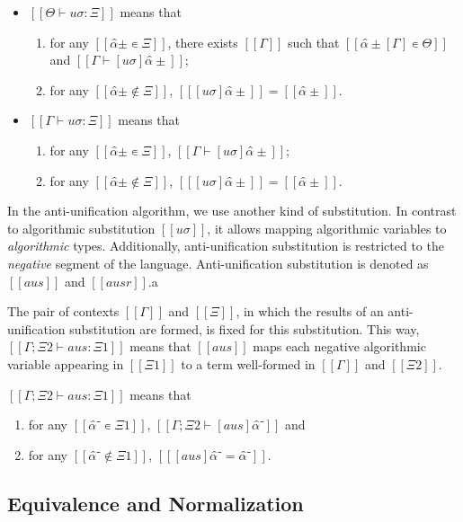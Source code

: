 \documentclass[acmsmall,natbib=false,review,anonymous]{acmart}
\begin{document}
\begin{definition}
  \label{def:algo-subst-sig}
  \hfill
  \begin{itemize}
    \item $[[Θ ⊢ uσ : Ξ]]$ means that
      \begin{enumerate}
        \item for any $[[α̂± ∊ Ξ]]$,
          there exists $[[Γ]]$ such that $[[ α̂±[Γ] ∊ Θ ]]$
          and $[[ Γ ⊢ [uσ]α̂± ]]$; 
        \item for any $[[ α̂± ∉ Ξ]]$, $[[ [uσ]α̂± ]] =  [[ α̂± ]]$.
      \end{enumerate}
    \item $[[Γ ⊢ uσ : Ξ]]$ means that
      \begin{enumerate}
        \item for any $[[α̂± ∊ Ξ]]$, $[[ Γ ⊢ [uσ]α̂± ]]$; 
        \item for any $[[ α̂± ∉ Ξ]]$, $[[ [uσ]α̂± ]] =  [[ α̂± ]]$.
      \end{enumerate}
  \end{itemize}
\end{definition}

In the anti-unification algorithm, we use another kind of substitution.
In contrast to algorithmic substitution $[[uσ]]$,
it allows mapping algorithmic variables to
\emph{algorithmic} types.
Additionally, anti-unification substitution is restricted to the
\emph{negative} segment of the language.
Anti-unification substitution is denoted as $[[aus]]$ and $[[ausr]]$.a

The pair of contexts $[[Γ]]$ and $[[Ξ]]$,
in which the results of an anti-unification substitution 
are formed, is fixed for this substitution.
This way, $[[Γ; Ξ2 ⊢ aus : Ξ1]]$ means that $[[aus]]$ maps each negative algorithmic
variable appearing in $[[Ξ1]]$ to a term well-formed in $[[Γ]]$ and $[[Ξ2]]$.

\begin{definition}
  $[[Γ; Ξ2 ⊢ aus : Ξ1]]$ means that
  \begin{enumerate}
    \item for any $[[ α̂⁻ ∊ Ξ1]]$, $[[ Γ; Ξ2 ⊢ [aus]α̂⁻ ]]$ and
    \item for any $[[ α̂⁻ ∉ Ξ1]]$, $[[ [aus]α̂⁻ = α̂⁻ ]]$.
  \end{enumerate}
\end{definition}

\subsection{Equivalence and Normalization}
\label{sec:equivalence-normalization}
\end{document}
